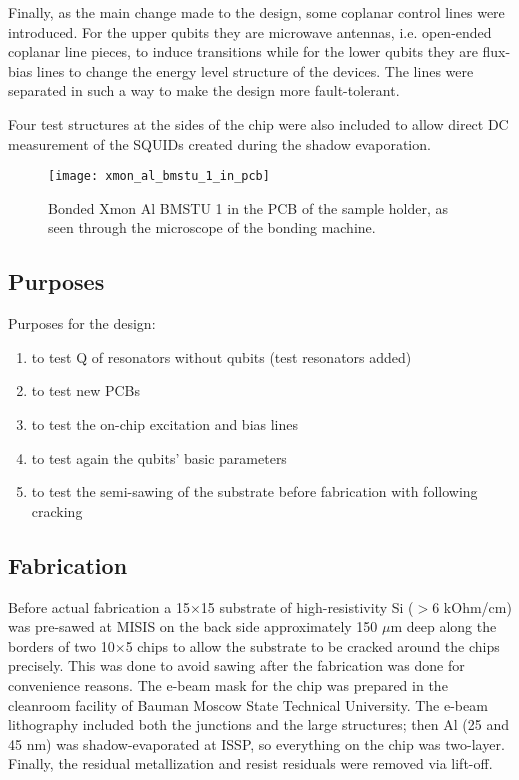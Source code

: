 \documentclass[12pt, twoside]{report}
\numberwithin{equation}{section}
\begin{document}
Finally, as the main change made to the design, some coplanar control lines were introduced. For the upper qubits they are microwave antennas, i.e. open-ended coplanar line pieces, to induce transitions while for the lower qubits they are flux-bias lines to change the energy level structure of the devices. The lines were separated in such a way to make the design more fault-tolerant.

Four test structures at the sides of the chip were also included to allow direct DC measurement of the SQUIDs created during the shadow evaporation.


\begin{figure}
\centering
\texttt{[image: xmon\_al\_bmstu\_1\_in\_pcb]}
\caption{Bonded Xmon Al BMSTU 1 in the PCB of the sample holder, as seen through the microscope of the bonding machine.}
\label{fig:first_tight_fit}
\end{figure}

\subsection{Purposes}


Purposes for the design:
\begin{enumerate}[label=(\alph*), leftmargin=1.5cm]
\itemsep0pt
\item to test Q of resonators without qubits (test resonators added)

\item to test new PCBs

\item to test the on-chip excitation and bias lines

\item to test again the qubits' basic parameters

\item to test the semi-sawing of the substrate before fabrication with following cracking

\end{enumerate}


\subsection{Fabrication}

Before actual fabrication a 15$\times$15 substrate of high-resistivity Si ($> 6$ kOhm/cm) was pre-sawed at MISIS on the back side approximately 150 $\mu$m deep along the borders of two 10$\times$5 chips to allow the substrate to be cracked around the chips precisely. This was done to avoid sawing after the fabrication was done for convenience reasons. The e-beam mask for the chip was prepared in the cleanroom facility of Bauman Moscow State Technical University. The e-beam lithography included both the junctions and the large structures; then Al (25 and 45 nm) was shadow-evaporated at ISSP, so everything on the chip was two-layer. Finally, the residual metallization and resist residuals were removed via lift-off.
\end{document}
